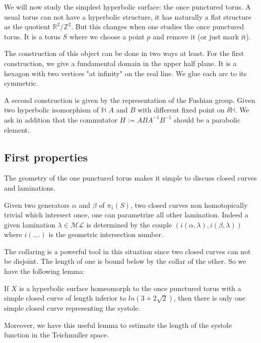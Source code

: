 We will now study the simplest hyperbolic surface: the once punctured torus.
A usual torus can not have a hyperbolic structure, it has naturally a flat structure as the quotient $\mathbb{R}^2 / \mathbb{Z}^2$.
But this changes when one studies the once punctured torus. It is a torus $S$ where we choose a point $p$ and remove it (or just mark it).


The construction of this object can be done in two ways at least.
For the first construction, we give a fundamental domain in the upper half plane. It is a hexagon with two vertices "at infinity" on the real line. We glue each arc to its symmetric.



A second construction is given by the representation of the Fushian group. Given two hyperbolic isomorphism of $\mathbb{H}$ $A$ and $B$ with different fixed point on $\delta \mathbb{H}$. We ask in addition that the commutator $H := ABA^{-1}B^{-1}$ should be a parabolic element.

\subsection{First properties}

The geometry of the one punctured torus makes it simple to discuss closed curves and laminations.
\begin{rmq}
Given two generators $\alpha$ and $\beta$ of $\pi_1(S)$, two closed curves non homotopically trivial which intersect once, one can parametrize all other lamination.
Indeed a given lamination $\lambda \in \mathcal{ML}$ is determined by the couple $(i(\alpha,\lambda),i(\beta,\lambda))$ where $i(.,.)$ is the geometric intersection number.
\end{rmq}

The collaring is a powerful tool in this situation since two closed curves can not be disjoint. The length of one is bound below by the collar of the other. So we have the following lemma:

\begin{lem}
If $X$ is a hyperbolic surface homeomorph to the once punctured torus with a simple closed curve of length inferior to $ln(3+2 \sqrt{2})$, then there is only one simple closed curve representing the systole.
\end{lem}

Moreover, we have this useful lemma to estimate the length of the systole function in the Teichmuller space.

